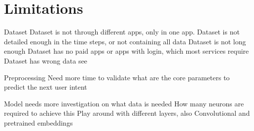 \section{Limitations}

Dataset
Dataset is not through different apps, only in one app.
Dataset is not detailed enough in the time steps, or not containing all data
Dataset is not long enough
Dataset has no paid apps or apps with login, which most services require
Dataset has wrong data see \cite{clay}

Preprocessing
Need more time to validate what are the core parameters to predict the next user intent


Model needs more investigation on what data is needed
How many neurons are required to achieve this
Play around with different layers, also Convolutional and pretrained embeddings

